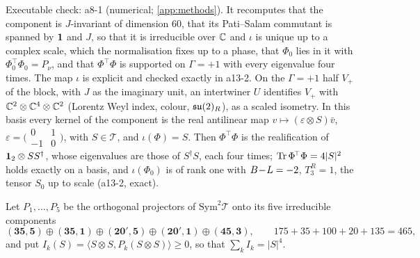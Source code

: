 \noindent Executable check: a8-1 (numerical; \cref{app:methods}). It recomputes that the component is $J$-invariant of dimension $60$, that its
Pati--Salam commutant is spanned by $\mathbf 1$ and $J$, so that it is irreducible over $\mathbb{C}$ and $\iota$ is unique up to a complex scale, which the normalisation
fixes up to a phase, that $\Phi_0$ lies in it with $\Phi_0^{\!\top}\Phi_0=P_\nu$, and that $\Phi^{\!\top}\Phi$ is supported on $\Gamma=+1$ with every eigenvalue
four times. The map $\iota$ is explicit and checked exactly in a13-2. On the $\Gamma=+1$ half $V_+$ of the block, with $J$ as the imaginary unit, an
intertwiner $U$ identifies $V_+$ with $\mathbb{C}^2\otimes\mathbb{C}^4\otimes\mathbb{C}^2$ (Lorentz Weyl index, colour, $\mathfrak{su}(2)_R$), as a scaled isometry. In this basis every kernel
of the component is the real antilinear map $v\mapsto(\varepsilon\otimes S)\bar v$, $\varepsilon=\bigl(\begin{smallmatrix}0&1\\-1&0\end{smallmatrix}\bigr)$, with
$S\in\mathcal T$, and $\iota(\Phi)=S$. Then $\Phi^{\!\top}\Phi$ is the realification of $\mathbf 1_2\otimes SS^\dagger$, whose eigenvalues are those of $S^\dagger S$,
each four times; $\operatorname{Tr}\Phi^{\!\top}\Phi=4|S|^2$ holds exactly on a basis, and $\iota(\Phi_0)$ is of rank one with $B\!-\!L=-2$, $T^R_3=1$, the tensor $S_0$ up to
scale (a13-2, exact).

Let $P_1,\dots,P_5$ be the orthogonal projectors of $\mathrm{Sym}^2\mathcal T$ onto its five irreducible components
\[
(\mathbf{35},\mathbf5)\oplus(\mathbf{35},\mathbf1)\oplus(\mathbf{20}',\mathbf5)\oplus(\mathbf{20}',\mathbf1)\oplus(\mathbf{45},\mathbf3),\qquad 175+35+100+20+135=465,
\]
and put $I_k(S)=\langle S\otimes S,P_k(S\otimes S)\rangle\ge0$, so that $\sum_kI_k=|S|^4$.

